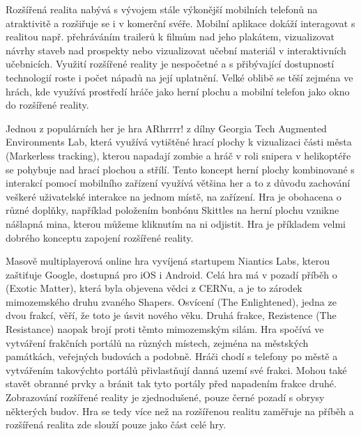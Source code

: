 \documentclass[twoside,12pt]{article}
\begin{document}
%
%
Rozšířená realita nabývá s vývojem stále výkonější mobilních telefonů na atraktivitě a rozšiřuje se i v komerční svéře. Mobilní aplikace dokáží interagovat s realitou např. přehráváním trailerů k filmům nad jeho plakátem, vizualizovat návrhy staveb nad prospekty nebo vizualizovat učební materiál v interaktivních učebnicích. Využití rozšířené reality je nespočetné a s přibývající dostupností technologií roste i počet nápadů na její uplatnění. Velké oblibě se těší zejména ve hrách, kde využívá prostředí hráče jako herní plochu a mobilní telefon jako okno do rozšířené reality.

% 
Jednou z populárních her je hra ARhrrrr! z dílny Georgia Tech Augmented Environments Lab, která využívá vytištěné hrací plochy k vizualizaci části města (Markerless tracking), kterou napadají zombie a hráč v roli snipera v helikoptéře se pohybuje nad hrací plochou a střílí. Tento koncept herní plochy kombinované s interakcí pomocí mobilního zařízení využívá většina her a to z důvodu zachování veškeré uživatelské interakce na jednom místě, na zařízení. Hra je obohacena o různé doplňky, například položením bonbónu Skittles na herní plochu vznikne nášlapná mina, kterou můžeme kliknutím na ni odjistit. Hra je příkladem velmi dobrého konceptu zapojení rozšířené reality.

%
% 

Masově multiplayerová online hra vyvíjená startupem Niantics Labs, kterou zaštiťuje Google, dostupná pro iOS i Android. Celá hra má v pozadí příběh o  (Exotic Matter), která byla objevena vědci z CERNu, a je to zárodek mimozemského druhu zvaného Shapers. Osvícení (The Enlightened), jedna ze dvou frakcí, věří, že toto je úsvit nového věku. Druhá frakce, Rezistence (The Resistance) naopak brojí proti těmto mimozemským silám. Hra spočívá ve vytváření frakčních portálů na různých místech, zejména na městských památkách, veřejných budovách a podobně. Hráči chodí s telefony po městě a vytvářením takovýchto portálů přivlastňují danná uzemí své frakci. Mohou také stavět obranné prvky a bránit tak tyto portály před napadením frakce druhé. Zobrazování rozšířené reality je zjednodušené, pouze černé pozadí s obrysy některých budov. Hra se tedy více než na rozšířenou realitu zaměřuje na příběh a rozšířená realita zde slouží pouze jako část celé hry.

%
%
\end{document}
